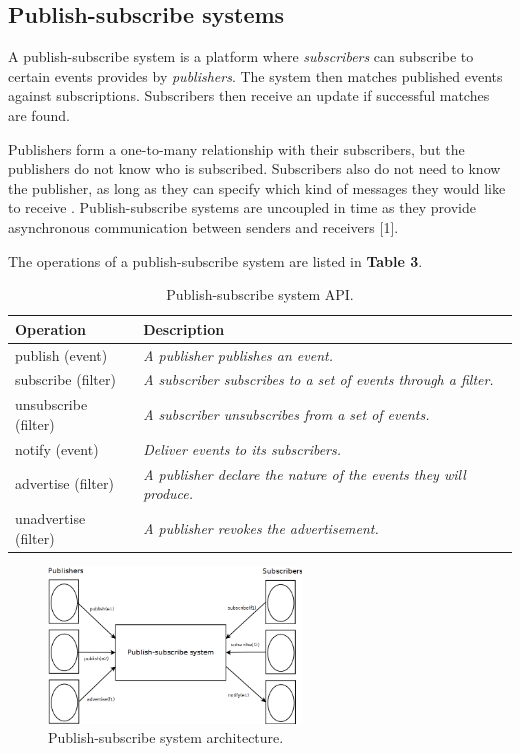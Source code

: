\subsection{Publish-subscribe systems}

A publish-subscribe system is a platform where \emph{subscribers} can subscribe to certain events provides by \emph{publishers}. The system then matches published events against subscriptions. Subscribers then receive an update if successful matches are found.

Publishers form a one-to-many relationship with their subscribers, but the publishers do not know who is subscribed. Subscribers also do not need to know the publisher, as long as they can specify which kind of messages they would like to receive . Publish-subscribe systems are uncoupled in time as they provide asynchronous communication between senders and receivers [1].

The operations of a publish-subscribe system are listed in \textbf{Table 3}.


\begin{table}
	\caption{Publish-subscribe system API.}
	\label{tab:api:publishsubscribersystems}
	\begin{tabular}{p{150px} | p{250px}}
		\textbf{Operation} & \textbf{Description} \\
		\hline
		publish (event) 			& \emph{A publisher publishes an event.} \\
		subscribe (filter) 		& \emph{A subscriber subscribes to a set of events through a filter.} \\
		unsubscribe (filter) 	& \emph{A subscriber unsubscribes from a set of events.} \\
		notify (event) 				& \emph{Deliver events to its subscribers.} \\
	  advertise (filter) 		& \emph{A publisher declare the nature of the events they will produce.} \\
		unadvertise (filter) 	& \emph{A publisher revokes the advertisement.} \\
		\hline
	\end{tabular}
\end{table}



\begin{figure}
	\begin{center}
		\includegraphics[width=0.6\textwidth]{img/publish-subscribesystem}
	\end{center}
	\caption{Publish-subscribe system architecture.}
	\label{fig:publish-subscribesystem}
\end{figure}




